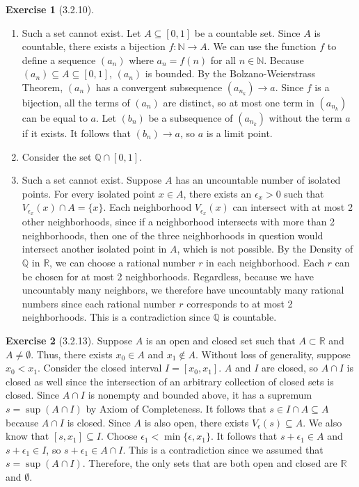 \documentclass{amsart}
\theoremstyle{definition}
\newtheorem{exercise}{Exercise}
\newcommand{\N}{\mathbb{N}}
\newcommand{\Q}{\mathbb{Q}}
\newcommand{\R}{\mathbb{R}}
\begin{document}
\begin{exercise}[3.2.10]
  \begin{enumerate}[label={(\roman*)}]
    \item Such a set cannot exist. Let $A \subseteq [0, 1]$ be a countable set.
      Since $A$ is countable, there exists a bijection $f : \N \to A$. We can
      use the function $f$ to define a sequence $(a_n)$ where $a_n = f(n)$ for
      all $n \in \N$. Because $(a_n) \subseteq A \subseteq [0, 1]$, $(a_n)$ is
      bounded. By the Bolzano-Weierstrass Theorem, $(a_n)$ has a convergent
      subsequence $(a_{n_k}) \to a$. Since $f$ is a bijection, all the terms of
      $(a_n)$ are distinct, so at most one term in $(a_{n_k})$ can be equal to
      $a$. Let $(b_n)$ be a subsequence of $(a_{n_k})$ without the term $a$ if
      it exists. It follows that $(b_n) \to a$, so $a$ is a limit point.
    \item Consider the set $\Q \cap [0, 1]$.
    \item Such a set cannot exist. Suppose $A$ has an uncountable number of
      isolated points. For every isolated point $x \in A$, there exists
      an $\epsilon_x > 0$ such that $V_{\epsilon_x}(x) \cap A = \{x\}$. Each
      neighborhood $V_{\epsilon_x}(x)$ can intersect with at most 2 other
      neighborhoods, since if a neighborhood intersects with more than 2
      neighborhoods, then one of the three neighborhoods in question  would
      intersect another isolated point in $A$, which is not possible. By the
      Density of $\Q$ in $\R$, we can choose a rational number $r$ in each
      neighborhood. Each $r$ can be chosen for at most 2 neighborhoods.
      Regardless, because we have uncountably many neighbors, we therefore have
      uncountably many rational numbers since each rational number $r$
      corresponds to at most 2 neighborhoods. This is a contradiction since $\Q$
      is countable.
  \end{enumerate}
\end{exercise}

\begin{exercise}[3.2.13]
  Suppose $A$ is an open and closed set such that $A \subset \R$ and $A \neq
  \emptyset$. Thus, there exists $x_0 \in A$ and $x_1 \notin A$. Without loss of
  generality, suppose $x_0 < x_1$. Consider the closed interval $I = [x_0,
  x_1]$. $A$ and $I$ are closed, so $A \cap I$ is closed as well since the
  intersection of an arbitrary collection of closed sets is closed. Since $A
  \cap I$ is nonempty and bounded above, it has a supremum $s = \sup(A \cap I)$
  by Axiom of Completeness. It follows that $s \in I \cap A \subseteq A$ because
  $A \cap I$ is closed. Since $A$ is also open, there exists $V_\epsilon(s)
  \subseteq A$. We also know that $[s, x_1] \subseteq I$. Choose $\epsilon_1 <
  \min\{\epsilon, x_1\}$. It follows that $s + \epsilon_1 \in A$ and $s +
  \epsilon_1 \in I$, so $s + \epsilon_1 \in A \cap I$. This is a contradiction
  since we assumed that $s = \sup(A \cap I)$. Therefore, the only sets that are
  both open and closed are $\R$ and $\emptyset$.
\end{exercise}
\end{document}
